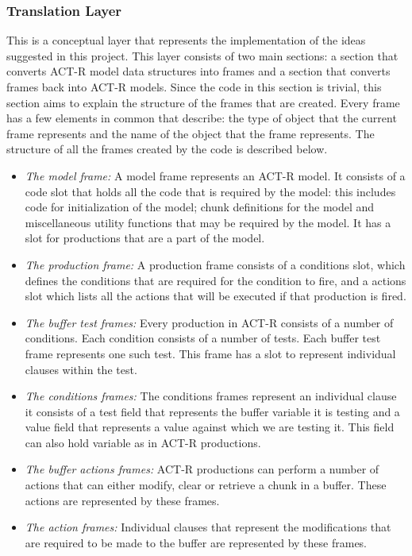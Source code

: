 \subsubsection{Translation Layer}

This is a conceptual layer that represents the implementation of the
ideas suggested in this project. This layer consists of two main
sections: a section that converts ACT-R model data structures into
frames and a section that converts frames back into ACT-R
models. Since the code in this section is trivial, this section aims
to explain the structure of the frames that are created. Every frame
has a few elements in common that describe: the type of object that the
current frame represents and the name of the object that the frame
represents. The structure of all the frames created by the code is
described below.


\begin{itemize}
\item \emph{The model frame:} A model frame represents an ACT-R
  model. It consists of a code slot that holds all the code that is
  required by the model: this includes code for initialization of the
  model; chunk definitions for the model and miscellaneous utility functions that may be required by
  the model. It has a slot for productions that are a part of the
  model.
\item \emph{The production frame:} A production frame consists of a
  conditions slot, which defines the conditions that are required for
  the condition to fire, and a actions slot which lists all the
  actions that will be executed if that production is fired.
\item \emph{The buffer test frames:} Every production in ACT-R consists
  of a number of conditions. Each condition consists of a number of
  tests. Each buffer test frame represents one such test. This frame
  has a slot to represent individual clauses within the test.
\item \emph{The conditions frames:} The conditions frames represent an
  individual clause it consists of a test field that represents the
  buffer variable it is testing and a value field that represents a
  value against which we are testing it. This field can also hold
  variable as in ACT-R productions.
\item \emph{The buffer actions frames:} ACT-R productions can perform
  a number of actions that can either modify, clear or retrieve a
  chunk in a buffer. These actions are represented by these frames.
\item \emph{The action frames:} Individual clauses that represent the
  modifications that are required to be made to the buffer are
  represented by these frames.
\end{itemize}

